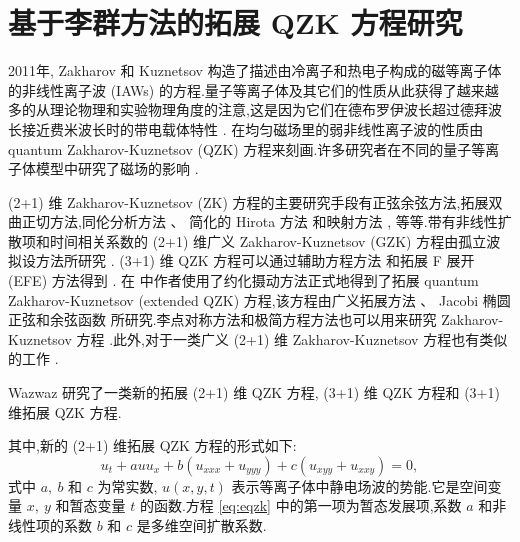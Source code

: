 \chapter{基于李群方法的拓展 QZK 方程研究}

2011年, Zakharov 和 Kuznetsov \cite{abdou2011quant} 构造了描述由冷离子和热电子构成的磁等离子体的非线性离子波 (IAWs) 的方程.量子等离子体及其它们的性质从此获得了越来越多的从理论物理和实验物理角度的注意,这是因为它们在德布罗伊波长超过德拜波长接近费米波长时的带电载体特性 \cite{abdou2011quant,ahmed2013kinks,bhrawy2013soli,biswas20091soli,biswas2013soli,bluman2010appli,elganaini2011tra,godleswski2004the,guner2015bright,ibragimov2006inte}. 在均匀磁场里的弱非线性离子波的性质由 quantum Zakharov-Kuznetsov (QZK) 方程来刻画.许多研究者在不同的量子等离子体模型中研究了磁场的影响 \cite{ibragimov2007anew,iwasaki1990cylin,johnpilai2011sym,khan2008linear,krishnan2010sol,leveque1992num,linares2009well,linares2011local,morris2013soli,moslem2007soli,mothibi2015con,moussa2001simi,munro2014con,munro2000sta,mushtaq2005non,olver2000app,peng2008exact,sabry2009non}.

(2+1) 维 Zakharov-Kuznetsov (ZK) 方程的主要研究手段有正弦余弦方法,拓展双曲正切方法,同伦分析方法 \cite{linares2009well}、 简化的 Hirota 方法 \cite{biswas2013soli,bluman2010appli} 和映射方法 \cite{morris2013soli}, 等等.带有非线性扩散项和时间相关系数的 (2+1) 维广义 Zakharov-Kuznetsov (GZK) 方程由孤立波拟设方法所研究 \cite{sabry2009non}. (3+1) 维 QZK 方程可以通过辅助方程方法 \cite{ahmed2013kinks} 和拓展 F 展开 (EFE) 方法得到 \cite{munro2000sta}. 在 \cite{ahmed2013kinks} 中作者使用了约化摄动方法正式地得到了拓展 quantum Zakharov-Kuznetsov (extended QZK) 方程,该方程由广义拓展方法 \cite{guner2015bright}、 Jacobi 椭圆正弦和余弦函数 \cite{biswas20091soli} 所研究.李点对称方法和极简方程方法也可以用来研究 Zakharov-Kuznetsov 方程 \cite{leveque1992num}.此外,对于一类广义 (2+1) 维 Zakharov-Kuznetsov 方程也有类似的工作 \cite{moslem2007soli}.

Wazwaz \cite{elganaini2011tra} 研究了一类新的拓展 (2+1) 维 QZK 方程, (3+1) 维 QZK 方程和 (3+1) 维拓展 QZK 方程.

其中,新的 (2+1) 维拓展 QZK 方程的形式如下:
\begin{equation}\label{eq:eqzk}
u_{t}+auu_{x}+b(u_{xxx}+u_{yyy})+c(u_{xyy}+u_{xxy})=0,
\end{equation}
式中 $a,~b$ 和 $c$ 为常实数, $u(x, y, t)$ 表示等离子体中静电场波的势能.它是空间变量 $x,~y$ 和暂态变量 $t$ 的函数.方程 \eqref{eq:eqzk} 中的第一项为暂态发展项,系数 $a$ 和非线性项的系数 $b$ 和 $c$ 是多维空间扩散系数.

